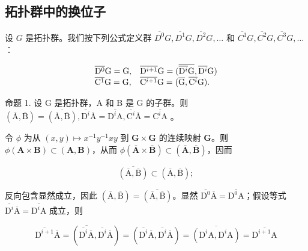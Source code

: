 \subsection{拓扑群中的换位子}

设 \(G\) 是拓扑群。我们按下列公式定义群 \(\overline{D^0}G, \overline{D^1}G, \overline{D^2}G, \ldots\) 和 \(\overline{C^1}G, \overline{C^2}G, \overline{C^3}G, \ldots\)：

\[
\begin{array}{l l} \overline {{\mathrm{D} ^ {0}}} \mathrm{G} = \mathrm{G}, & \overline {{\mathrm{D} ^ {i + 1}}} \mathrm{G} = (\overline {{\overline {{\mathrm{D} ^ {i}}} \mathrm{G}}}, \overline {{\mathrm{D} ^ {i}}} \mathrm{G}) \\ \overline {{\mathrm{C} ^ {1}}} \mathrm{G} = \mathrm{G}, & \overline {{\mathrm{C} ^ {i + 1}}} \mathrm{G} = (\overline {{\mathrm{G}}}, \overline {{\mathrm{C} ^ {i}}} \mathrm{G}). \end{array}
\]

命题 1. 设 G 是拓扑群，A 和 B 是 G 的子群。则 \((\overline{\mathrm{A}},\overline{\mathrm{B}}) = \overline{(\overline{\mathrm{A}},\overline{\mathrm{B}})},\overline{\mathrm{D}^{i}}\overline{\mathrm{A}} = \overline{\mathrm{D}^{i}\mathrm{A}},\overline{\mathrm{C}^{i}}\overline{\mathrm{A}} = \overline{\mathrm{C}^{i}\mathrm{A}}\) 。

令 \(\phi\) 为从 \((x,y)\mapsto x^{-1}y^{-1}xy\) 到 \(\mathbf{G}\times \mathbf{G}\) 的连续映射 \(\mathbf{G}\)。则 \(\phi (\mathbf{A}\times \mathbf{B})\subset (\mathbf{A},\mathbf{B})\)，从而 \(\phi (\overline{\mathbf{A}}\times \overline{\mathbf{B}})\subset (\overline{\mathbf{A}},\overline{\mathbf{B}})\)，因而

\[
\overline{(\overline{\mathrm{A}},\overline{\mathrm{B}})} \subset (\overline{\mathrm{A}},\overline{\mathrm{B}});
\]

反向包含显然成立，因此 \((\overline{\mathrm{A}},\overline{\mathrm{B}}) = \overline{(\overline{\mathrm{A}},\overline{\mathrm{B}})}\)。显然 \(\overline{\mathrm{D}^{0}}\overline{\mathrm{A}} = \overline{\mathrm{D}^{0}\mathrm{A}}\)；假设等式 \(\overline{\mathrm{D}^{i}}\overline{\mathrm{A}} = \overline{\mathrm{D}^{i}\mathrm{A}}\) 成立，则

\[
\overline{\mathrm{D}^{i+1}}\overline{\mathrm{A}} = (\overline{\overline{\mathrm{D}^{i}}\overline{\mathrm{A}}},\overline{\mathrm{D}^{i}}\overline{\mathrm{A}}) = (\overline{\mathrm{D}^{i}}\overline{\mathrm{A}},\overline{\mathrm{D}^{i}}\overline{\mathrm{A}}) = \overline{(\mathrm{D}^{i}\mathrm{A},\mathrm{D}^{i}\mathrm{A})} = \overline{\mathrm{D}^{i+1}\mathrm{A}}
\]

